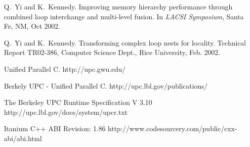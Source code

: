 \begin{thebibliography}{WW}
Q.~Yi and K.~Kennedy.
\newblock Improving memory hierarchy performance through combined loop
  interchange and multi-level fusion.
\newblock In {\em LACSI Symposium}, Santa Fe, NM, Oct 2002.

Q.~Yi and K.~Kennedy.
\newblock Transforming complex loop nests for locality.
\newblock Technical Report TR02-386, Computer Science Dept., Rice University,
  Feb. 2002.

\newblock Unified Parallel C.
\newblock http://upc.gwu.edu/

\newblock Berkely UPC - Unified Parallel C.
\newblock http://upc.lbl.gov/publications/

\newblock The Berkeley UPC Runtime Specification V 3.10
\newblock http://upc.lbl.gov/docs/system/upcr.txt

\newblock Itanium C++ ABI Revision: 1.86
\newblock http://www.codesourcery.com/public/cxx-abi/abi.html

\end{thebibliography}






